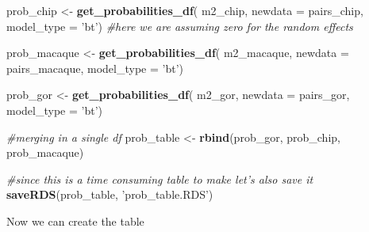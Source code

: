 \documentclass[
]{book}
\newenvironment{Shaded}{\begin{snugshade}}{\end{snugshade}}
\newcommand{\CommentTok}[1]{\textcolor[rgb]{0.56,0.35,0.01}{\textit{#1}}}
\newcommand{\DataTypeTok}[1]{\textcolor[rgb]{0.13,0.29,0.53}{#1}}
\newcommand{\KeywordTok}[1]{\textcolor[rgb]{0.13,0.29,0.53}{\textbf{#1}}}
\newcommand{\NormalTok}[1]{#1}
\newcommand{\StringTok}[1]{\textcolor[rgb]{0.31,0.60,0.02}{#1}}
\begin{document}
\begin{Shaded}
\begin{Highlighting}[]
\NormalTok{prob_chip <-}
\StringTok{  }\KeywordTok{get_probabilities_df}\NormalTok{(}
\NormalTok{    m2_chip, }
    \DataTypeTok{newdata =}\NormalTok{ pairs_chip,}
    \DataTypeTok{model_type =} \StringTok{'bt'}\NormalTok{) }\CommentTok{#here we are assuming zero for the random effects}

\NormalTok{prob_macaque <-}
\StringTok{  }\KeywordTok{get_probabilities_df}\NormalTok{(}
\NormalTok{    m2_macaque, }
    \DataTypeTok{newdata =}\NormalTok{ pairs_macaque, }
    \DataTypeTok{model_type =} \StringTok{'bt'}\NormalTok{)}

\NormalTok{prob_gor <-}
\StringTok{  }\KeywordTok{get_probabilities_df}\NormalTok{(}
\NormalTok{    m2_gor, }
    \DataTypeTok{newdata =}\NormalTok{ pairs_gor, }
    \DataTypeTok{model_type =} \StringTok{'bt'}\NormalTok{)}

\CommentTok{#merging in a single df}
\NormalTok{prob_table <-}\StringTok{ }\KeywordTok{rbind}\NormalTok{(prob_gor, prob_chip, prob_macaque)}

\CommentTok{#since this is  a time consuming table to make let's also save it}
\KeywordTok{saveRDS}\NormalTok{(prob_table, }\StringTok{'prob_table.RDS'}\NormalTok{)}
\end{Highlighting}
\end{Shaded}

Now we can create the table
\end{document}
